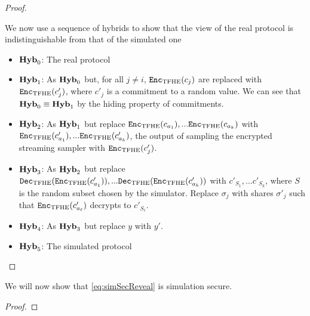 \begin{lemma}
\begin{proof}
\begin{enumerate}
		\end{enumerate}
		We now use a sequence of hybrids to show that the view of the real protocol is indistinguishable from
		that of the simulated one
		\begin{itemize}
			\item $\mathrm{\textbf{Hyb}}_{0}$: The real protocol
			\item $\mathrm{\textbf{Hyb}}_{1}$: As $\mathrm{\textbf{Hyb}}_{0}$ but, for all $j \neq i$, $\texttt{Enc}_{\mathrm{TFHE}}(c_j)$ are replaced with $\texttt{Enc}_{\mathrm{TFHE}}(c'_j)$, where $c'_j$ is a commitment to a random value.
			      We can see that $\mathrm{\textbf{Hyb}}_{0} \equiv \mathrm{\textbf{Hyb}}_{1}$ by the hiding property of commitments.
			\item $\mathrm{\textbf{Hyb}}_{2}$: As $\mathrm{\textbf{Hyb}}_{1}$ but replace $\texttt{Enc}_{\mathrm{TFHE}}(c_{a_1}),... \texttt{Enc}_{\mathrm{TFHE}}(c_{a_k})$ with
			      $\texttt{Enc}_{\mathrm{TFHE}}(c'_{a_1}),... \texttt{Enc}_{\mathrm{TFHE}}(c'_{a_k})$, the output of sampling the encrypted streaming sampler with $\texttt{Enc}_{\mathrm{TFHE}}(c'_j)$.
			\item $\mathrm{\textbf{Hyb}}_{3}$: As $\mathrm{\textbf{Hyb}}_{2}$ but replace $\texttt{Dec}_{\mathrm{TFHE}}(\texttt{Enc}_{\mathrm{TFHE}}(c'_{a_1})),... \texttt{Dec}_{\mathrm{TFHE}}(\texttt{Enc}_{\mathrm{TFHE}}(c'_{a_k}))$ with
			      $c'_{S_1},... c'_{S_k}$, where $S$ is the random subset chosen by the simulator.
			      Replace $\sigma_j$ with shares $\sigma'_j$ such that $\texttt{Enc}_{\mathrm{TFHE}}(c'_{a_\ell})$ decrypts to $c'_{S_\ell}$.
			\item $\mathrm{\textbf{Hyb}}_{4}$: As $\mathrm{\textbf{Hyb}}_{3}$ but replace $y$ with $y'$.

			\item $\mathrm{\textbf{Hyb}}_{5}$: The simulated protocol
		\end{itemize}


	\end{proof}
\end{lemma}

\begin{lemma}
	We will now show that \cref{eq:simSecReveal} is simulation secure.
	\begin{proof}

	\end{proof}
\end{lemma}

